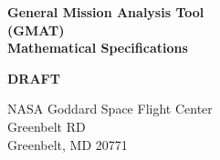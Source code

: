 
\begin{center}
{\renewcommand{\thefootnote}{\fnsymbol{footnote}} { \Huge \bf
General Mission Analysis Tool\\ (GMAT)\\ Mathematical Specifications
}}
\end{center}
\begin{center}
{\renewcommand{\thefootnote}{\fnsymbol{footnote}} { \Huge \bf
 DRAFT }}
\end{center}

\vspace{-.2 in}
\begin{center}
\Large{NASA Goddard Space Flight Center\\
Greenbelt RD\\
Greenbelt, MD 20771}
\end{center}

\clearpage \clearpage
